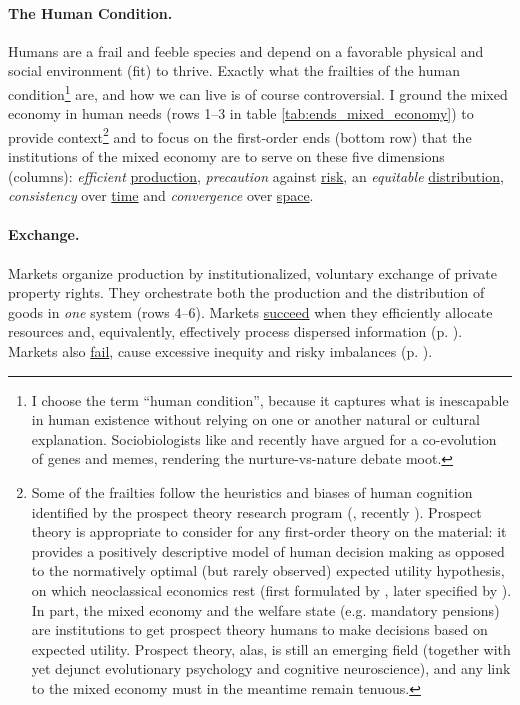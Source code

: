 
	

\paragraph{The Human Condition.} \label{sec:human_condition}  Humans are a frail and feeble species and depend on a favorable physical and social environment (fit) to thrive. Exactly what the frailties of the human condition\footnote{
	\label{fn:human_condition}I choose the term ``human condition'', because it captures what is inescapable in human existence without relying on one or another natural or cultural explanation. Sociobiologists like \cite{Boyd1985} and recently \cite{Henrich2007} have argued for a co-evolution of genes and memes, rendering the nurture-vs-nature debate moot.}
are, and how we can live is of course controversial. I ground the mixed economy in human needs (rows 1--3 in table \ref{tab:ends_mixed_economy}) to provide context\footnote{
	Some of the frailties follow the heuristics and biases of human cognition identified by the prospect theory research program (\citealt{Kahneman1979}, recently \citealt{Kahneman2011}). Prospect theory is appropriate to consider for any first-order theory on the material: it provides a positively descriptive model of human decision making as opposed to the normatively optimal (but rarely observed) expected utility hypothesis, on which neoclassical economics rest (first formulated by \citealt{Bernoulli1738}, later specified by \citealt{VonNeumann1944}). In part, the mixed economy and the welfare state (e.g. mandatory pensions) are institutions to get prospect theory humans to make decisions based on expected utility. Prospect theory, alas, is still an emerging field (together with yet dejunct evolutionary psychology and cognitive neuroscience), and any link to the mixed economy must in the meantime remain tenuous.} 
and to focus on the first-order ends (bottom row) that the institutions of the mixed economy are to serve on these five dimensions (columns): \emph{efficient} \hyperref[sec:production]{production}, \emph{precaution} against \hyperref[sec:risk]{risk}, an \emph{equitable} \hyperref[sec:distribution]{distribution}, \emph{consistency} over \hyperref[sec:time]{time} and \emph{convergence} over \hyperref[sec:space]{space}.

\paragraph[Exchange]{Exchange.}  \label{sec:exchange} 
Markets organize production by institutionalized, voluntary exchange of private property rights. They orchestrate both the production and the distribution of goods in \emph{one} system (rows 4--6). Markets \hyperref[sec:market_solutions_production]{succeed} when they efficiently allocate resources and, equivalently, effectively process dispersed information (p. \pageref{sec:market_solutions_production}). Markets also \hyperref[sec:market_failures]{fail}, cause excessive inequity and risky imbalances (p. \pageref{sec:market_failures}). 

